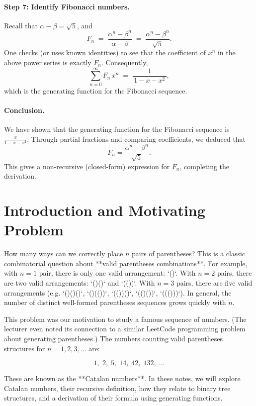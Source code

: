 \documentclass{article}
\begin{document}
\paragraph{Step 7: Identify Fibonacci numbers.}

Recall that \(\alpha - \beta = \sqrt{5}\), and
\[
F_n
\;=\;
\frac{\alpha^n - \beta^n}{\,\alpha - \beta\,}
\;=\;
\frac{\alpha^n - \beta^n}{\,\sqrt{5}\,}.
\]
One checks (or uses known identities) to see that the coefficient of \(x^n\) in the above power series is exactly \(F_n\).  Consequently,
\[
\sum_{n=0}^\infty F_n \, x^n
\;=\;
\frac{1}{\,1 - x - x^2\,},
\]
which is the generating function for the Fibonacci sequence.

\paragraph{Conclusion.}
We have shown that the generating function for the Fibonacci sequence is 
\(\tfrac{x}{1 - x - x^2}\).  
Through partial fractions and comparing coefficients, we deduced that
\[
F_n = \frac{\alpha^n - \beta^n}{\sqrt{5}}.
\]
This gives a non-recursive (closed-form) expression for \(F_n\), completing the derivation.

\section{Introduction and Motivating Problem}

How many ways can we correctly place $n$ pairs of parentheses? This is a classic combinatorial question about **valid parentheses combinations**. For example, with $n=1$ pair, there is only one valid arrangement: `()`. With $n=2$ pairs, there are two valid arrangements: `()()` and `(())`. With $n=3$ pairs, there are five valid arrangements (e.g. `()()()`, `()(())`, `(())()`, `(()())`, `((()))`). In general, the number of distinct well-formed parentheses sequences grows quickly with $n$. 

This problem was our motivation to study a famous sequence of numbers. (The lecturer even noted its connection to a similar LeetCode programming problem about generating parentheses.) The numbers counting valid parentheses structures for $n=1,2,3,\dots$ are:

\[1,\; 2,\; 5,\; 14,\; 42,\; 132,\;\dots\]

These are known as the **Catalan numbers**. In these notes, we will explore Catalan numbers, their recursive definition, how they relate to binary tree structures, and a derivation of their formula using generating functions.
\end{document}
